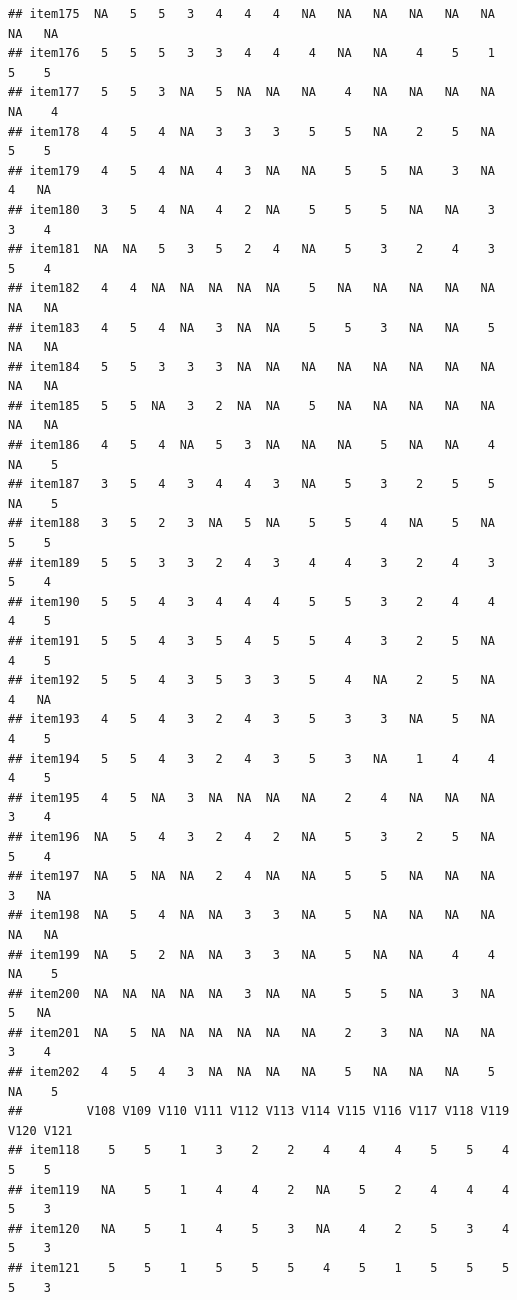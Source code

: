 \documentclass[
  man]{apa6}
\begin{document}
\begin{verbatim}
## item175  NA   5   5   3   4   4   4   NA   NA   NA   NA   NA   NA   NA   NA
## item176   5   5   5   3   3   4   4    4   NA   NA    4    5    1    5    5
## item177   5   5   3  NA   5  NA  NA   NA    4   NA   NA   NA   NA   NA    4
## item178   4   5   4  NA   3   3   3    5    5   NA    2    5   NA    5    5
## item179   4   5   4  NA   4   3  NA   NA    5    5   NA    3   NA    4   NA
## item180   3   5   4  NA   4   2  NA    5    5    5   NA   NA    3    3    4
## item181  NA  NA   5   3   5   2   4   NA    5    3    2    4    3    5    4
## item182   4   4  NA  NA  NA  NA  NA    5   NA   NA   NA   NA   NA   NA   NA
## item183   4   5   4  NA   3  NA  NA    5    5    3   NA   NA    5   NA   NA
## item184   5   5   3   3   3  NA  NA   NA   NA   NA   NA   NA   NA   NA   NA
## item185   5   5  NA   3   2  NA  NA    5   NA   NA   NA   NA   NA   NA   NA
## item186   4   5   4  NA   5   3  NA   NA   NA    5   NA   NA    4   NA    5
## item187   3   5   4   3   4   4   3   NA    5    3    2    5    5   NA    5
## item188   3   5   2   3  NA   5  NA    5    5    4   NA    5   NA    5    5
## item189   5   5   3   3   2   4   3    4    4    3    2    4    3    5    4
## item190   5   5   4   3   4   4   4    5    5    3    2    4    4    4    5
## item191   5   5   4   3   5   4   5    5    4    3    2    5   NA    4    5
## item192   5   5   4   3   5   3   3    5    4   NA    2    5   NA    4   NA
## item193   4   5   4   3   2   4   3    5    3    3   NA    5   NA    4    5
## item194   5   5   4   3   2   4   3    5    3   NA    1    4    4    4    5
## item195   4   5  NA   3  NA  NA  NA   NA    2    4   NA   NA   NA    3    4
## item196  NA   5   4   3   2   4   2   NA    5    3    2    5   NA    5    4
## item197  NA   5  NA  NA   2   4  NA   NA    5    5   NA   NA   NA    3   NA
## item198  NA   5   4  NA  NA   3   3   NA    5   NA   NA   NA   NA   NA   NA
## item199  NA   5   2  NA  NA   3   3   NA    5   NA   NA    4    4   NA    5
## item200  NA  NA  NA  NA  NA   3  NA   NA    5    5   NA    3   NA    5   NA
## item201  NA   5  NA  NA  NA  NA  NA   NA    2    3   NA   NA   NA    3    4
## item202   4   5   4   3  NA  NA  NA   NA    5   NA   NA   NA    5   NA    5
##         V108 V109 V110 V111 V112 V113 V114 V115 V116 V117 V118 V119 V120 V121
## item118    5    5    1    3    2    2    4    4    4    5    5    4    5    5
## item119   NA    5    1    4    4    2   NA    5    2    4    4    4    5    3
## item120   NA    5    1    4    5    3   NA    4    2    5    3    4    5    3
## item121    5    5    1    5    5    5    4    5    1    5    5    5    5    3

\end{verbatim}
\end{document}
